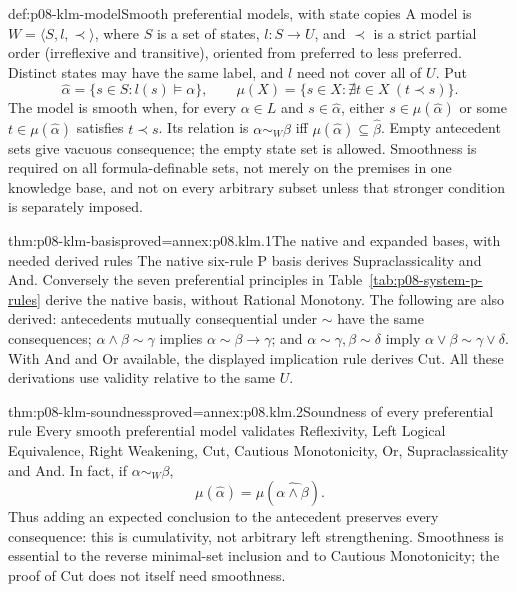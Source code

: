 \begin{hbdefinition}{def:p08-klm-model}{Smooth preferential models, with state copies}
A model is \(W=\langle S,l,\prec\rangle\), where \(S\) is a set
of states, \(l:S\to U\), and \(\prec\) is a strict partial order
(irreflexive and transitive), oriented from preferred to less preferred.
Distinct states may have the same label, and \(l\) need not cover all
of \(U\). Put
\[
 \widehat\alpha=\{s\in S:l(s)\models\alpha\},\qquad
 \mu(X)=\{s\in X:\nexists t\in X\ (t\prec s)\}.
\]
The model is smooth when, for every \(\alpha\in L\) and
\(s\in\widehat\alpha\), either \(s\in\mu(\widehat\alpha)\)
or some \(t\in\mu(\widehat\alpha)\) satisfies \(t\prec s\).
Its relation is \(\alpha\sim_W\beta\) iff
\(\mu(\widehat\alpha)\subseteq\widehat\beta\).
Empty antecedent sets give vacuous consequence; the empty state set is
allowed. Smoothness is required on all formula-definable sets, not merely
on the premises in one knowledge base, and not on every arbitrary subset
unless that stronger condition is separately imposed.
\end{hbdefinition}



\begin{hbtheorem}{thm:p08-klm-basis}{proved=annex:p08.klm.1}{The native and expanded bases, with needed derived rules}
The native six-rule P basis derives Supraclassicality and And. Conversely
the seven preferential principles in Table~\ref{tab:p08-system-p-rules}
derive the native basis, without Rational Monotony.
The following are also derived: antecedents mutually consequential under
\(\sim\) have the same consequences; \(\alpha\wedge\beta\sim\gamma\)
implies \(\alpha\sim\beta\to\gamma\); and
\(\alpha\sim\gamma,\beta\sim\delta\) imply
\(\alpha\vee\beta\sim\gamma\vee\delta\).
With And and Or available, the displayed implication rule derives Cut.
All these derivations use validity relative to the same \(U\).
\end{hbtheorem}

\begin{hbtheorem}{thm:p08-klm-soundness}{proved=annex:p08.klm.2}{Soundness of every preferential rule}
Every smooth preferential model validates Reflexivity, Left Logical
Equivalence, Right Weakening, Cut, Cautious Monotonicity, Or,
Supraclassicality and And. In fact, if \(\alpha\sim_W\beta\),
\[
 \mu(\widehat\alpha)=\mu(\widehat{\alpha\wedge\beta}).
\]
Thus adding an expected conclusion to the antecedent preserves every
consequence: this is cumulativity, not arbitrary left strengthening.
Smoothness is essential to the reverse minimal-set inclusion and to
Cautious Monotonicity; the proof of Cut does not itself need smoothness.
\end{hbtheorem}


